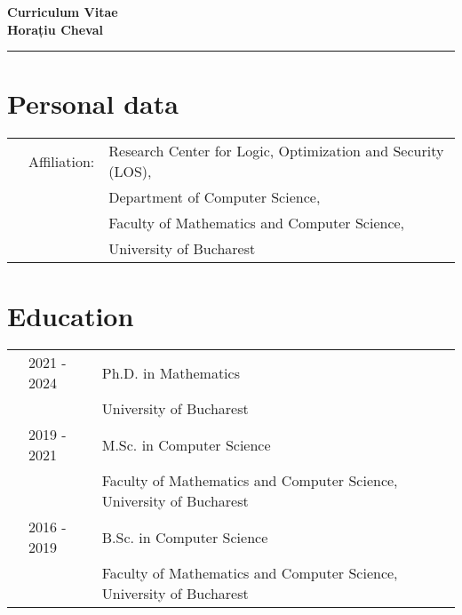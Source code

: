 \documentclass[letterpaper,11pt,oneside]{article}
\begin{document}

\noindent  \huge{\textbf{Curriculum Vitae \\ Horațiu Cheval}}  \\
\vspace{-2ex}
\hrule
\normalsize




\vspace{1em}



\noindent
\section{Personal data}
\normalsize 
\begin{tabular}{@{} l l l}
    &Affiliation:& Research Center for Logic, Optimization and Security (LOS), \\ 
    && Department of Computer Science, \\ 
    && Faculty of Mathematics and Computer Science, \\ 
    && University of Bucharest 
\end{tabular}


\noindent
\section{Education} 
\normalsize
\begin{tabular}{@{} l l l}
    & 2021 - 2024 & Ph.D. in Mathematics \\ 
    &                & University of Bucharest \\
    & 2019 - 2021 & M.Sc. in Computer Science \\  
    &                & Faculty of Mathematics and Computer Science, University of Bucharest \\
    & 2016 - 2019    & B.Sc. in Computer Science \\
    &                & Faculty of Mathematics and Computer Science, University of Bucharest \\

\end{tabular}
\end{document}
